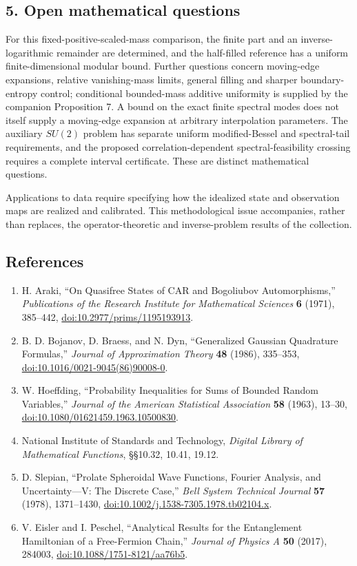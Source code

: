 \documentclass[
  10pt,
  a4paper,
]{article}
\begin{document}
\subsection{5. Open mathematical questions}\label{open-mathematical-questions}

For this fixed-positive-scaled-mass comparison, the finite part and an inverse-logarithmic remainder are determined, and the half-filled reference has a uniform finite-dimensional modular bound. Further questions concern moving-edge expansions, relative vanishing-mass limits, general filling and sharper boundary-entropy control; conditional bounded-mass additive uniformity is supplied by the companion Proposition 7. A bound on the exact finite spectral modes does not itself supply a moving-edge expansion at arbitrary interpolation parameters. The auxiliary \(SU(2)\) problem has separate uniform modified-Bessel and spectral-tail requirements, and the proposed correlation-dependent spectral-feasibility crossing requires a complete interval certificate. These are distinct mathematical questions.

Applications to data require specifying how the idealized state and observation maps are realized and calibrated. This methodological issue accompanies, rather than replaces, the operator-theoretic and inverse-problem results of the collection.

\subsection{References}\label{references}

\begin{enumerate}
\def\labelenumi{\arabic{enumi}.}
\item
  H. Araki, ``On Quasifree States of CAR and Bogoliubov Automorphisms,'' \emph{Publications of the Research Institute for Mathematical Sciences} \textbf{6} (1971), 385--442, \url{doi:10.2977/prims/1195193913}.
\item
  B. D. Bojanov, D. Braess, and N. Dyn, ``Generalized Gaussian Quadrature Formulas,'' \emph{Journal of Approximation Theory} \textbf{48} (1986), 335--353, \url{doi:10.1016/0021-9045(86)90008-0}.
\item
  W. Hoeffding, ``Probability Inequalities for Sums of Bounded Random Variables,'' \emph{Journal of the American Statistical Association} \textbf{58} (1963), 13--30, \url{doi:10.1080/01621459.1963.10500830}.
\item
  National Institute of Standards and Technology, \emph{Digital Library of Mathematical Functions}, §§10.32, 10.41, 19.12.
\item
  D. Slepian, ``Prolate Spheroidal Wave Functions, Fourier Analysis, and Uncertainty---V: The Discrete Case,'' \emph{Bell System Technical Journal} \textbf{57} (1978), 1371--1430, \url{doi:10.1002/j.1538-7305.1978.tb02104.x}.
\item
  V. Eisler and I. Peschel, ``Analytical Results for the Entanglement Hamiltonian of a Free-Fermion Chain,'' \emph{Journal of Physics A} \textbf{50} (2017), 284003, \url{doi:10.1088/1751-8121/aa76b5}.
\end{enumerate}
\end{document}
